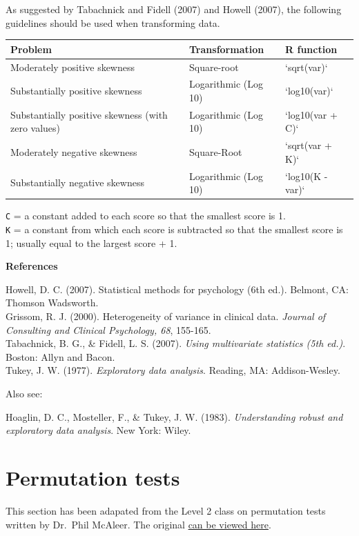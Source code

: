 \documentclass[]{book}
\begin{document}
As suggested by Tabachnick and Fidell (2007) and Howell (2007), the following guidelines
should be used when transforming data.

\begin{tabular}{l|l|l}
\hline
Problem & Transformation & R function\\
\hline
Moderately positive skewness & Square-root & `sqrt(var)`\\
\hline
Substantially positive skewness & Logarithmic (Log 10) & `log10(var)`\\
\hline
Substantially positive skewness (with zero values) & Logarithmic (Log 10) & `log10(var + C)`\\
\hline
Moderately negative skewness & Square-Root & `sqrt(var + K)`\\
\hline
Substantially negative skewness & Logarithmic (Log 10) & `log10(K - var)`\\
\hline
\end{tabular}

\texttt{C} = a constant added to each score so that the smallest score is 1.\\
\texttt{K} = a constant from which each score is subtracted so that the smallest score is 1; usually equal to the largest score + 1.

\textbf{References}

Howell, D. C. (2007). Statistical methods for psychology (6th ed.). Belmont, CA: Thomson
Wadsworth.\\
Grissom, R. J. (2000). Heterogeneity of variance in clinical data. \emph{Journal of Consulting and Clinical Psychology, 68}, 155-165.\\
Tabachnick, B. G., \& Fidell, L. S. (2007). \emph{Using multivariate statistics (5th ed.)}. Boston: Allyn and Bacon.\\
Tukey, J. W. (1977). \emph{Exploratory data analysis}. Reading, MA: Addison-Wesley.

Also see:

Hoaglin, D. C., Mosteller, F., \& Tukey, J. W. (1983). \emph{Understanding robust and exploratory data analysis}. New York: Wiley.

\hypertarget{permutation-tests}{%
\section{Permutation tests}\label{permutation-tests}}

This section has been adapated from the Level 2 class on permutation tests written by Dr.~Phil McAleer. The original \href{https://psyteachr.github.io/ug2-practical/permutation-tests-a-skill-set.html}{can be viewed here}.
\end{document}
